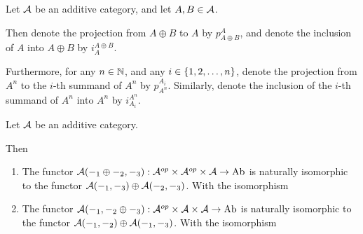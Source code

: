 \begin{notation}
    Let \( {\mathcal{A}} \) be an additive category, and let \( A, B \in {\mathcal{A}} \).

    Then denote the projection from \( A \oplus B \) to \( A \) by \( p_{A \oplus B}^A \), and denote the inclusion of \( A \) into \( A \oplus B \) by \( i_A^{A \oplus B} \).

    Furthermore, for any \( n \in {\mathbb{N}} \), and any \( i \in \left\{ 1, 2, \dots, n \right\} \), denote the projection from \( A^n \) to the \( i \)-th summand of \( A^n \) by \( p_{A^n}^{A_i} \). Similarly, denote the inclusion of the \( i \)-th summand of \( A^n \) into \( A^n \) by \( i_{A_i}^{A^n} \).
\end{notation}

\begin{lemma} %
    Let \( {\mathcal{A}} \) be an additive category.
    
    Then 
    \begin{enumerate}
        \item {
            The functor \( {\mathcal{A}}(-_1 \oplus -_2, -_3): {\mathcal{A}}^{op} \times {\mathcal{A}}^{op} \times {\mathcal{A}} \to \operatorname{Ab} \) is naturally isomorphic to the functor \( {\mathcal{A}}(-_1, -_3) \oplus {\mathcal{A}}(-_2, -_3) \). With the isomorphism

            \begin{center}
            \end{center}
        }
        \item {
            The functor \( {\mathcal{A}}(-_1, -_2 \oplus -_3): {\mathcal{A}}^{op} \times {\mathcal{A}} \times {\mathcal{A}} \to \operatorname{Ab} \) is naturally isomorphic to the functor \( {\mathcal{A}}(-_1, -_2) \oplus {\mathcal{A}}(-_1, -_3) \). With the isomorphism

}
\end{enumerate}
\end{lemma}
